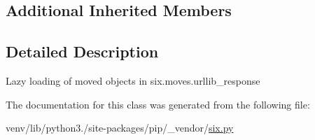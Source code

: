 \subsection*{Additional Inherited Members}


\subsection{Detailed Description}
\begin{DoxyVerb}Lazy loading of moved objects in six.moves.urllib_response\end{DoxyVerb}
 

The documentation for this class was generated from the following file\+:\begin{DoxyCompactItemize}
\item 
venv/lib/python3./site-\/packages/pip/\+\_\+vendor/\hyperlink{pip_2__vendor_2six_8py}{six.\+py}\end{DoxyCompactItemize}
